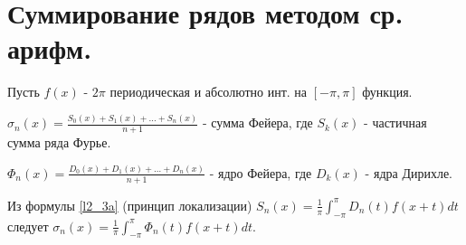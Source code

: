 \documentclass{article}
\begin{document}
\section{Суммирование рядов методом ср. арифм.}
Пусть $f(x)$ - $2\pi$ периодическая и абсолютно инт. на $[-\pi,\pi]$ функция.
\begin{definition}
  $\sigma_{n}(x)=\frac{S_0(x)+S_1(x)+\dots +S_n(x)}{n+1}$
  - сумма Фейера, где $S_k(x)$ - частичная сумма ряда Фурье.
\end{definition}
\begin{definition}
  $\Phi_n(x)=\frac{D_0(x)+D_1(x)+\dots +D_n(x)}{n+1}$ - ядро Фейера,
  где $D_k(x)$ - ядра Дирихле.
\end{definition}
Из формулы \ref{l2_3a} (принцип локализации) 
$S_n(x)=\frac{1}{\pi}\int_{-\pi}^{\pi}D_n(t)f(x+t)dt$
следует $\sigma_n(x)=\frac{1}{\pi}\int_{-\pi}^{\pi}\Phi_n(t)f(x+t)dt$.
\end{document}
